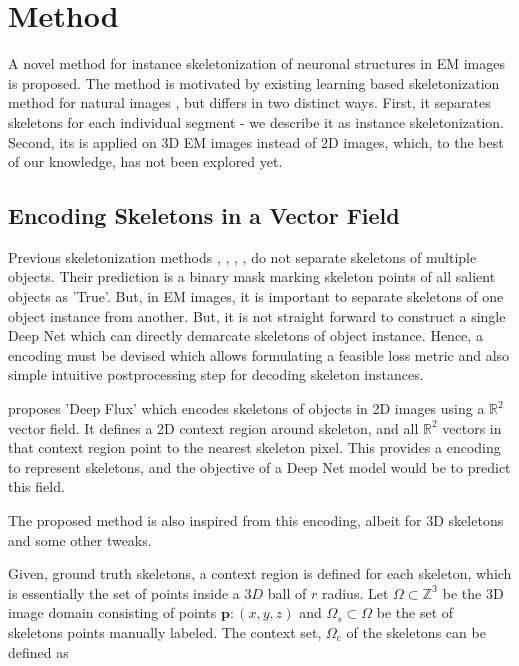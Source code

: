 
\chapter{Method}\label{chapter:method}

A novel method for instance skeletonization of neuronal structures in EM images is proposed. The method is motivated by existing learning based skeletonization method for natural images \cite{Wang2019}, but differs in two distinct ways. First, it separates skeletons for each individual segment - we describe it as instance skeletonization. Second, its is applied on 3D EM images instead of 2D images, which, to the best of our knowledge, has not been explored yet. 
 
\section{Encoding Skeletons in a Vector Field}
Previous skeletonization methods \cite{Shen2016}, \cite{Shen2017}, \cite{Ke2017}, \cite{Wang2019}, \cite{Xu2019} do not separate skeletons of multiple objects. Their prediction is a binary mask marking skeleton points of all salient objects as 'True'. But, in EM images, it is important to separate skeletons of one object instance from another. 
But, it is not straight forward to construct a single Deep Net which can directly demarcate skeletons of object instance. Hence, a encoding must be devised which allows formulating a feasible loss metric and also simple intuitive postprocessing step for decoding skeleton instances. 

\cite{Wang2019} proposes 'Deep Flux' which encodes skeletons of objects in 2D images using a $\mathbb{R}^2$ vector field. It defines a 2D context region around skeleton, and all $\mathbb{R}^2$ vectors in that context region point to the nearest skeleton pixel. This provides a encoding to represent skeletons, and the objective of a Deep Net model would be to predict this field.

The proposed method is also inspired from this encoding, albeit for 3D skeletons and some other tweaks.

Given, ground truth skeletons, a context region is defined for each skeleton, which is essentially the set of points inside a $3D$ ball of $r$ radius.
Let $\Omega \subset \mathbb{Z^3}$  be the 3D image domain consisting of points $\mathbf{p}: (x, y, z)$ and ${\Omega}_s \subset \Omega$ be the set of skeletons points manually labeled. The context set, ${\Omega}_c$ of the skeletons can be defined as

